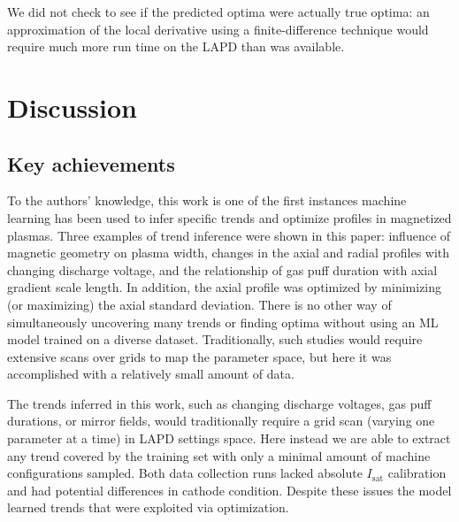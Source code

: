 We did not check to see if the predicted optima were actually true optima: an approximation of the local derivative using a finite-difference technique would require much more run time on the LAPD than was available. 

\section{Discussion}
\label{sec:isat-predict_discussion}

\subsection{Key achievements}

To the authors' knowledge, this work is one of the first instances machine learning has been used to infer specific trends and optimize profiles in magnetized plasmas. Three examples of trend inference were shown in this paper: influence of magnetic geometry on plasma width, changes in the axial and radial profiles with changing discharge voltage, and the relationship of gas puff duration with axial gradient scale length. In addition, the axial profile was optimized by minimizing (or maximizing) the axial standard deviation. There is no other way of simultaneously uncovering many trends or finding optima without using an ML model trained on a diverse dataset. Traditionally, such studies would require extensive scans over grids to map the parameter space, but here it was accomplished with a relatively small amount of data.


The trends inferred in this work, such as changing discharge voltages, gas puff durations, or mirror fields, would traditionally require a grid scan (varying one parameter at a time) in LAPD settings space. Here instead we are able to extract any trend covered by the training set with only a minimal amount of machine configurations sampled. Both data collection runs lacked absolute $I_\text{sat}$ calibration and had potential differences in cathode condition. Despite these issues the model learned trends that were exploited via optimization. 

